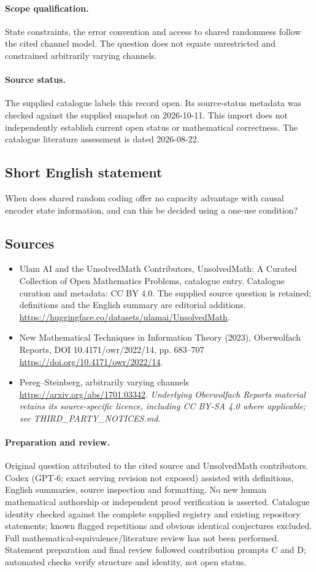 \documentclass[11pt]{article}
\begin{document}
\paragraph{Scope qualification.}
State constraints, the error convention and access to shared randomness follow the cited channel model. The question does not equate unrestricted and constrained arbitrarily varying channels.
\paragraph{Source status.}
The supplied catalogue labels this record open. Its source-status metadata was checked against the supplied snapshot on 2026-10-11. This import does not independently establish current open status or mathematical correctness. The catalogue literature assessment is dated 2026-08-22.
\subsection{Short English statement}
When does shared random coding offer no capacity advantage with causal encoder state information, and can this be decided using a one-use condition?
\subsection{Sources}
\begin{itemize}
\item[S1] Ulam AI and the UnsolvedMath Contributors, UnsolvedMath: A Curated Collection of Open Mathematics Problems, catalogue entry. Catalogue curation and metadata: CC BY 4.0. The supplied source question is retained; definitions and the English summary are editorial additions.
\url{https://huggingface.co/datasets/ulamai/UnsolvedMath}.
\item[S2] New Mathematical Techniques in Information Theory (2023), Oberwolfach Reports, DOI 10.4171/owr/2022/14, pp. 683--707
\url{https://doi.org/10.4171/owr/2022/14}.
\item[S3] Pereg--Steinberg, arbitrarily varying channels
\url{https://arxiv.org/abs/1701.03342}.
\textit{Underlying Oberwolfach Reports material retains its source-specific licence, including CC BY-SA 4.0 where applicable; see THIRD\_PARTY\_NOTICES.md.}
\end{itemize}
\paragraph{Preparation and review.}
Original question attributed to the cited source and UnsolvedMath contributors. Codex (GPT-6; exact serving revision not exposed) assisted with definitions, English summaries, source inspection and formatting. No new human mathematical authorship or independent proof verification is asserted. Catalogue identity checked against the complete supplied registry and existing repository statements; known flagged repetitions and obvious identical conjectures excluded. Full mathematical-equivalence/literature review has not been performed. Statement preparation and final review followed contribution prompts C and D; automated checks verify structure and identity, not open status.
\label{end:statement}
\end{document}

